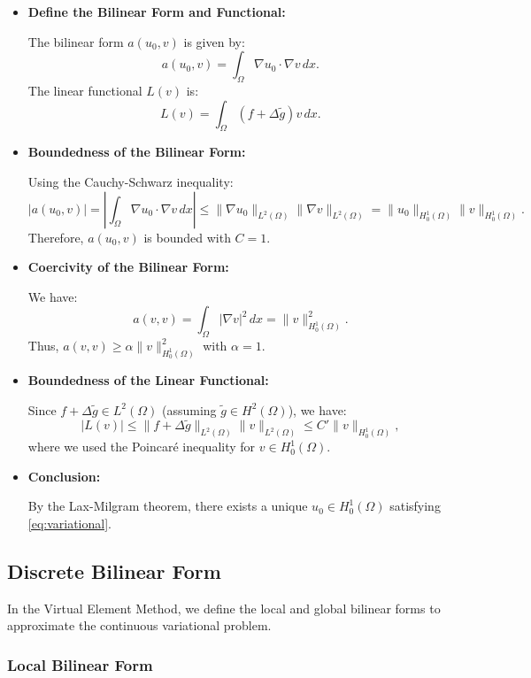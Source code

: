 \documentclass[class=article, crop=false]{standalone}
\begin{document}
\begin{itemize}
    \item \textbf{Define the Bilinear Form and Functional:}

    The bilinear form $a(u_0, v)$ is given by:
    \[
    a(u_0, v) = \int_{\Omega} \nabla u_0 \cdot \nabla v \, dx.
    \]
    The linear functional $L(v)$ is:
    \[
    L(v) = \int_{\Omega} (f + \Delta \tilde{g}) v \, dx.
    \]

    \item \textbf{Boundedness of the Bilinear Form:}

    Using the Cauchy-Schwarz inequality:
    \[
    |a(u_0, v)| = \left| \int_{\Omega} \nabla u_0 \cdot \nabla v \, dx \right| \leq \|\nabla u_0\|_{L^2(\Omega)} \|\nabla v\|_{L^2(\Omega)} = \|u_0\|_{H^1_0(\Omega)} \|v\|_{H^1_0(\Omega)}.
    \]
    Therefore, $a(u_0, v)$ is bounded with $C = 1$.

    \item \textbf{Coercivity of the Bilinear Form:}

    We have:
    \[
    a(v, v) = \int_{\Omega} |\nabla v|^2 \, dx = \|v\|_{H^1_0(\Omega)}^2.
    \]
    Thus, $a(v, v) \geq \alpha \|v\|_{H^1_0(\Omega)}^2$ with $\alpha = 1$.

    \item \textbf{Boundedness of the Linear Functional:}

    Since $f + \Delta \tilde{g} \in L^2(\Omega)$ (assuming $\tilde{g} \in H^2(\Omega)$), we have:
    \[
    |L(v)| \leq \|f + \Delta \tilde{g}\|_{L^2(\Omega)} \|v\|_{L^2(\Omega)} \leq C' \|v\|_{H^1_0(\Omega)},
    \]
    where we used the Poincaré inequality for $v \in H^1_0(\Omega)$.

    \item \textbf{Conclusion:}

    By the Lax-Milgram theorem, there exists a unique $u_0 \in H^1_0(\Omega)$ satisfying \eqref{eq:variational}.
\end{itemize}

\subsection{Discrete Bilinear Form}

In the Virtual Element Method, we define the local and global bilinear forms to approximate the continuous variational problem.

\subsubsection{Local Bilinear Form}
\end{document}
